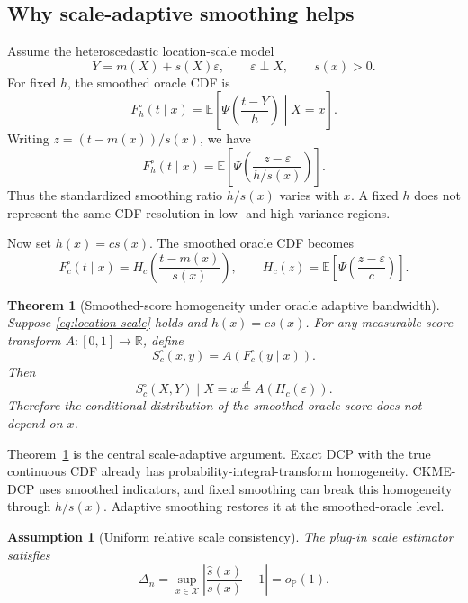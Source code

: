 \documentclass[11pt]{article}
\newtheorem{assumption}{Assumption}
\newtheorem{theorem}{Theorem}
\newcommand{\Xcal}{\mathcal X}
\newcommand{\E}{\mathbb E}
\newcommand{\R}{\mathbb R}
\newcommand{\abs}[1]{\left\lvert #1 \right\rvert}
\newcommand{\op}{o_{\mathbb P}}
\begin{document}
\subsection{Why scale-adaptive smoothing helps}

Assume the heteroscedastic location-scale model
\begin{equation}
  Y=m(X)+s(X)\varepsilon,\qquad \varepsilon\perp X,\qquad s(x)>0.
  \label{eq:location-scale}
\end{equation}
For fixed \(h\), the smoothed oracle CDF is
\[
  F_h^\circ(t\mid x)=
  \E\left[
  \Psi\!\left(\frac{t-Y}{h}\right)\middle|X=x
  \right].
\]
Writing \(z=(t-m(x))/s(x)\), we have
\begin{equation}
  F_h^\circ(t\mid x)=
  \E\left[
  \Psi\!\left(\frac{z-\varepsilon}{h/s(x)}\right)
  \right].
  \label{eq:fixed-distortion}
\end{equation}
Thus the standardized smoothing ratio \(h/s(x)\) varies with \(x\). A fixed \(h\) does not represent the same CDF resolution in low- and high-variance regions.

Now set \(h(x)=c s(x)\). The smoothed oracle CDF becomes
\begin{equation}
  F_c^\circ(t\mid x)=
  H_c\!\left(\frac{t-m(x)}{s(x)}\right),
  \qquad
  H_c(z)=\E\left[\Psi\!\left(\frac{z-\varepsilon}{c}\right)\right].
  \label{eq:adaptive-representation}
\end{equation}

\begin{theorem}[Smoothed-score homogeneity under oracle adaptive bandwidth]
\label{thm:homogeneity}
Suppose \eqref{eq:location-scale} holds and \(h(x)=c s(x)\). For any measurable score transform \(A:[0,1]\to\R\), define
\[
  S_c^\circ(x,y)=A(F_c^\circ(y\mid x)).
\]
Then
\[
  S_c^\circ(X,Y)\mid X=x
  \overset{d}{=}
  A(H_c(\varepsilon)).
\]
Therefore the conditional distribution of the smoothed-oracle score does not depend on \(x\).
\end{theorem}

Theorem~\ref{thm:homogeneity} is the central scale-adaptive argument. Exact DCP with the true continuous CDF already has probability-integral-transform homogeneity. CKME-DCP uses smoothed indicators, and fixed smoothing can break this homogeneity through \(h/s(x)\). Adaptive smoothing restores it at the smoothed-oracle level.

\begin{assumption}[Uniform relative scale consistency]
\label{ass:scale}
The plug-in scale estimator satisfies
\[
  \Delta_n
  =
  \sup_{x\in\Xcal}
  \abs{\frac{\widehat s(x)}{s(x)}-1}
  =\op(1).
\]
\end{assumption}
\end{document}
